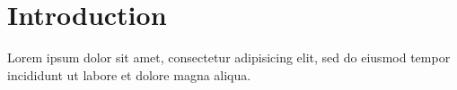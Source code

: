 \section{Introduction}
\label{sec:intro}

Lorem ipsum dolor sit amet, consectetur adipisicing elit, sed do eiusmod
tempor incididunt ut labore et dolore magna aliqua. 



